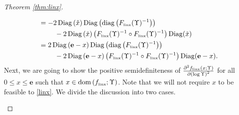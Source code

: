 \documentclass[smallextended]{svjour3hack}       %
\DeclareMathOperator{\Diag}{Diag}
\DeclareMathOperator{\diag}{diag}
\DeclareMathOperator{\dom}{dom}
\begin{document}
\begin{proof}[Theorem \ref{thm:linx}]
\begin{itemize}
\begin{align*}
        & ~= -2 \Diag\left(\check{x}\right) \Diag\left(\diag\left(F_{{\tiny\mbox{linx}}}(\Upsilon)^{-1}\right)\right) \\
        &~~~~\quad ~-2  \Diag\left(\check{x}\right)   \left(F_{{\tiny\mbox{linx}}}(\Upsilon)^{-1}\circ F_{{\tiny\mbox{linx}}}(\Upsilon)^{-1}\right) \Diag(\check{x})\\
        &~ =2 \Diag\left(\mathbf{e}-x\right) \Diag\left(\diag\left(F_{{\tiny\mbox{linx}}}(\Upsilon)^{-1}\right)\right) \\
        &~~~~\quad ~ - 2  \Diag\left(\mathbf{e}-x\right)   \left(F_{{\tiny\mbox{linx}}}(\Upsilon)^{-1}\circ F_{{\tiny\mbox{linx}}}(\Upsilon)^{-1}\right) \Diag(\mathbf{e}-x).
    \end{align*}
\smallskip
    Next, we are going to show the positive semidefiniteness of $\frac{\partial^2 f_{{\tiny\mbox{linx}}}\left(x;\Upsilon\right)}{\partial \left(\log \Upsilon\right) ^2} $ for all $0\le x \le \mathbf{e}$ such that $x\in \dom\left(f_{{\tiny\mbox{linx}}};\Upsilon\right)$. Note that we will not require $x$ to be feasible to \ref{linx}. We divide the discussion into two cases.


\end{itemize}
\end{proof}
\end{document}
